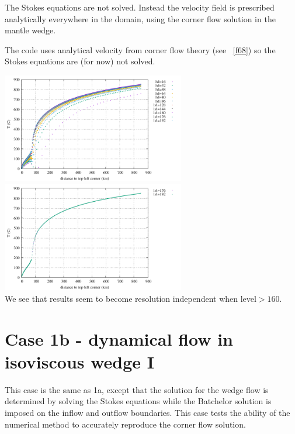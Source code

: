 The Stokes equations are not solved. Instead the velocity field
is prescribed analytically everywhere in the domain, using the corner flow solution 
in the mantle wedge. 

The code uses analytical velocity from corner flow theory (see \stone~\ref{f68})
so the Stokes equations are (for now) not solved. 


\begin{center}
\includegraphics[width=8cm]{python_codes/fieldstone_149/results/case1a/diagT.pdf}
\includegraphics[width=8cm]{python_codes/fieldstone_149/results/case1a/diagT2.pdf}\\
{\captionfont We see that results seem to become resolution independent
when level$>160$.} 
\end{center}

\section*{Case 1b - dynamical flow in isoviscous wedge I}

This case is the same as 1a, except that the solution
for the wedge flow is determined by solving the Stokes equations while the Batchelor solution is
imposed on the inflow and outflow boundaries. This case tests the ability of the numerical method
to accurately reproduce the corner flow solution.

